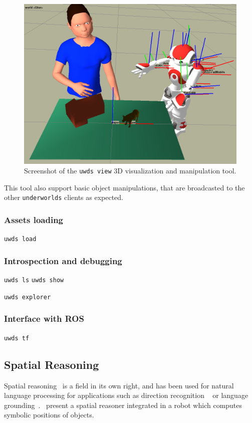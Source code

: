 \documentclass[letterpaper, 10 pt, conference]{ieeeconf}  %
\newcommand{\uwds}{{\tt underworlds}\xspace}
\begin{document}
\begin{figure}
    \centering
    \includegraphics[width=0.9\linewidth]{uwds-screenshot}
    \caption{Screenshot of the {\tt uwds view} 3D visualization and manipulation
    tool.}
    \label{fig|uwds-view}
\end{figure}

This tool also support basic object manipulations, that are broadcasted to the
other \uwds clients as expected.

\subsubsection{Assets loading}

{\tt uwds load}

\subsubsection{Introspection and debugging}

{\tt uwds ls}
{\tt uwds show}

{\tt uwds explorer}


\subsubsection{Interface with ROS}

{\tt uwds tf}

\subsection{Spatial Reasoning}

Spatial reasoning~\cite{O'Keefe1999} is a field in its own right, and has been
used for natural language processing for applications such as direction
recognition ~\cite{Kollar2010,Matuszek2010} or language
grounding~\cite{Tellex2010}.~\cite{Skubic2004} present a spatial reasoner
integrated in a robot which computes symbolic positions of objects.
\end{document}

